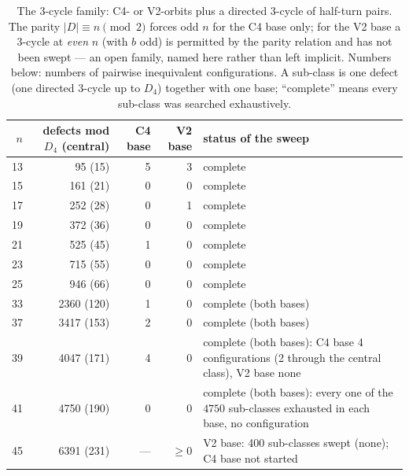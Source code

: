 \documentclass[11pt]{article}
\theoremstyle{remark}
\newcommand{\Dfour}{D_4}
\begin{document}
\begin{table}[ht]\centering\small
\begin{tabular}{r r r r p{5.9cm}}
\toprule
$n$ & defects mod $\Dfour$ (central) & C4 base & V2 base & status of the sweep\\
\midrule
13 & 95 (15) & 5 & 3 & complete\\
15 & 161 (21) & 0 & 0 & complete\\
17 & 252 (28) & 0 & 1 & complete\\
19 & 372 (36) & 0 & 0 & complete\\
21 & 525 (45) & 1 & 0 & complete\\
23 & 715 (55) & 0 & 0 & complete\\
25 & 946 (66) & 0 & 0 & complete\\
33 & 2360 (120) & 1 & 0 & complete (both bases)\\
37 & 3417 (153) & 2 & 0 & complete (both bases)\\
39 & 4047 (171) & 4 & 0 & complete (both bases): C4 base 4 configurations (2 through the central class), V2 base none\\
41 & 4750 (190) & 0 & 0 & complete (both bases): every one of the $4750$ sub-classes exhausted in each base, no configuration\\
45 & 6391 (231) & --- & $\ge0$ & V2 base: 400 sub-classes swept (none); C4 base not started\\
\bottomrule
\end{tabular}
\caption{The $3$-cycle family: C4- or V2-orbits plus a directed $3$-cycle of half-turn pairs.  The parity $|D|\equiv n\pmod2$ forces odd $n$ for the C4 base only; for the V2 base a $3$-cycle at \emph{even} $n$ (with $b$ odd) is permitted by the parity relation and has not been swept --- an open family, named here rather than left implicit.  Numbers below: numbers of pairwise
inequivalent configurations.  A sub-class is one defect (one directed $3$-cycle up to $\Dfour$) together with one base;
``complete'' means every sub-class was searched exhaustively.}\label{tab:threecycle}
\end{table}
\end{document}
